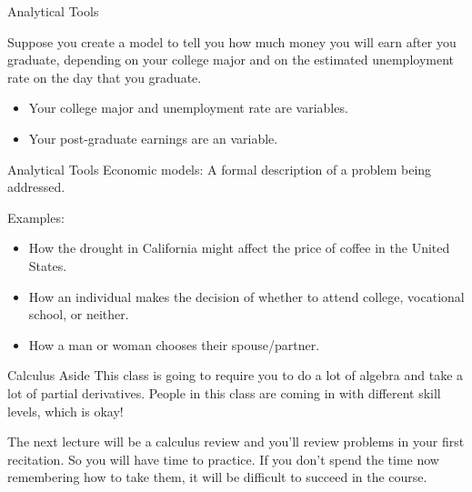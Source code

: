 \documentclass[12pt,t]{beamer}
\begin{document}
\begin{frame}{Analytical Tools}
  \bigskip
  
  Suppose you create a model to tell you how much money you will earn after you graduate, depending on your college major and on the estimated unemployment rate on the day that you graduate.
  \pause
  \begin{itemize}
    \item Your college major and unemployment rate are  variables.
    \item Your post-graduate earnings are an  variable.
  \end{itemize}
\end{frame}

\begin{frame}{Analytical Tools}
  Economic models: A formal description of a problem being addressed.

  \bigskip
  Examples:
  \begin{itemize}
    \item How the drought in California might affect the price of coffee in the United States.
    \item How an individual makes the decision of whether to attend college, vocational school, or neither.
    \item How a man or woman chooses their spouse/partner.
  \end{itemize}
\end{frame}

\begin{frame}{Calculus Aside}
  This class is going to require you to do a lot of algebra and take a lot of partial derivatives. People in this class are coming in with different skill levels, which is okay!

  \bigskip
  The next lecture will be a calculus review and you'll review problems in your first recitation.  So you will have time to practice.  If you don't spend the time now remembering how to take them, it will be difficult to succeed in the course.
\end{frame}
\end{document}
